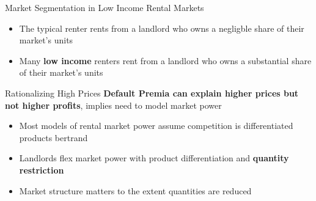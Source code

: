 \documentclass[10pt, xcolor=dvipsnames]{beamer}
\begin{document}
    

\begin{frame}{Market Segmentation in Low Income Rental Markets}
    \begin{itemize}
        \item The typical renter rents from a landlord who owns a negligble share of their market's units
        \item Many \textbf{low income} renters rent from a landlord who owns a substantial share of their market's units
    \end{itemize}
\end{frame}

    


\begin{frame}{Rationalizing High Prices}
\textbf{Default Premia can explain higher prices but not higher profits}, implies need to model market power
    \begin{itemize}
    \item Most models of rental market power assume competition is differentiated products bertrand \parencite{watson2024rent, framoutar2024market}
        \item Landlords flex market power with product differentiation and \textbf{quantity restriction}
        \item Market structure matters to the extent quantities are reduced
    \end{itemize}

\end{frame}
\end{document}

